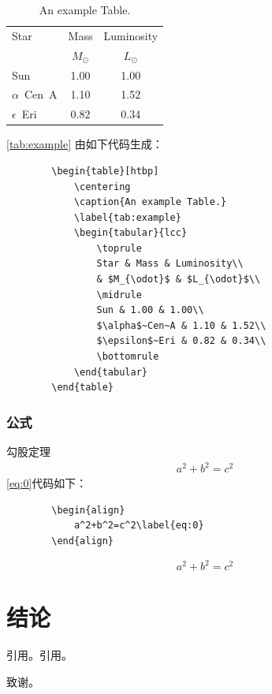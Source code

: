 \documentclass{YNUbachelor}
\begin{document}
	\begin{table}[htbp]
		\centering
		\caption{An example Table.}
		\label{tab:example}
		\begin{tabular}{lcc}
			\toprule
			Star & Mass & Luminosity\\
			& $M_{\odot}$ & $L_{\odot}$\\
			\midrule
			Sun & 1.00 & 1.00\\
			$\alpha$~Cen~A & 1.10 & 1.52\\
			$\epsilon$~Eri & 0.82 & 0.34\\
			\bottomrule
		\end{tabular}
	\end{table}
	\autoref{tab:example} 由如下代码生成：
	\begin{verbatim}
		\begin{table}[htbp]
			\centering
			\caption{An example Table.}
			\label{tab:example}
			\begin{tabular}{lcc}
				\toprule
				Star & Mass & Luminosity\\
				& $M_{\odot}$ & $L_{\odot}$\\
				\midrule
				Sun & 1.00 & 1.00\\
				$\alpha$~Cen~A & 1.10 & 1.52\\
				$\epsilon$~Eri & 0.82 & 0.34\\
				\bottomrule
			\end{tabular}
		\end{table}
	\end{verbatim}

	\subsubsection{公式}
	
	勾股定理
	\begin{align}
		a^2+b^2=c^2\label{eq:0}
	\end{align}
	\autoref{eq:0}代码如下：
	\begin{verbatim}
		\begin{align}
			a^2+b^2=c^2\label{eq:0}
		\end{align}
	\end{verbatim}

	\[
		a^2+b^2=c^2
	\]
	\section{结论}
	引用\cite{向守平2008天体物理概论}。引用\cite{BQC_2020}。
	\begin{acknowledgement}
		致谢。
	\end{acknowledgement}

	
	
	
	\backcover%
\end{document}
